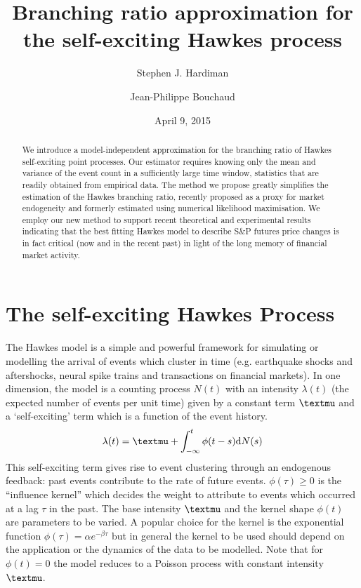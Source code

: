 \documentclass{article}
\begin{document}
\title{Branching ratio approximation for the self-exciting Hawkes process}

\author{
  Stephen J. Hardiman
  \and
  Jean-Philippe Bouchaud
}

\date{April 9, 2015}

\maketitle

\begin{abstract}
  We introduce a model-independent approximation for the branching ratio of
  Hawkes self-exciting point processes. Our estimator requires knowing only
  the mean and variance of the event count in a sufficiently large time
  window, statistics that are readily obtained from empirical data. The method
  we propose greatly simplifies the estimation of the Hawkes branching ratio,
  recently proposed as a proxy for market endogeneity and formerly estimated
  using numerical likelihood maximisation. We employ our new method to support
  recent theoretical and experimental results indicating that the best fitting
  Hawkes model to describe S\&P futures price changes is in fact critical (now
  and in the recent past) in light of the long memory of financial market
  activity.
\end{abstract}

\section{The self-exciting Hawkes Process}

The Hawkes model {\cite{hawkes,hawkes2}} is a simple and powerful framework
for simulating or modelling the arrival of events which cluster in time (e.g.
earthquake shocks and aftershocks, neural spike trains and transactions on
financial markets). In one dimension, the model is a counting process $N (t)$
with an intensity $\lambda (t)$ (the expected number of events per unit time)
given by a constant term ${\textmu}$ and a `self-exciting' term which is a
function of the event history.
\begin{equation}
  \lambda (t) ={\textmu}+ \int_{- \infty}^t \phi (t - s) \mathrm{d} N (s)
  \label{eq:hawkes}
\end{equation}
This self-exciting term gives rise to event clustering through an endogenous
feedback: past events contribute to the rate of future events. $\phi (\tau)
\geq 0$ is the ``influence kernel'' which decides the weight to attribute to
events which occurred at a lag $\tau$ in the past. The base intensity
${\textmu}$ and the kernel shape $\phi (t)$ are parameters to be varied. A
popular choice for the kernel is the exponential function $\phi (\tau) =
\alpha e^{- \beta \tau}$ {\cite{filimonov,ozaki}} but in general the kernel to
be used should depend on the application or the dynamics of the data to be
modelled. Note that for $\phi (t) = 0$ the model reduces to a Poisson process
with constant intensity ${\textmu}$.
\end{document}

